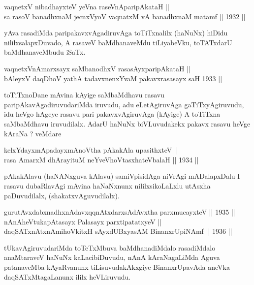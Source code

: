 \begin{shl}
vaqnetxV nibadhayxteV yeVna raseVnA\s \s paripAkataH ||  \\
sa rasoV banadhxnaM jecnxVyoV vaqnatxM vA banadhxnaM matamf ||  1932 || 
\end{shl}

\begin{artha}
yAva rasadiMda paripakavxvAgadiruvAga toTiTxnalilx (haNuNx) hiDidu
nililxsalapxDuvado, A rasaveV baMdhanaveMdu tiLiyabeVku, toTATxdarU
baMdhanaveMbudu iSaTx.
\end{artha}

\begin{shl}
vaqnetxVnA\s \s marxsayx saMbanodhxV rasasAyx\s \s paripAkataH || \\
bAleyxV daqDhoV yathA tadavxnenxYvaM pakavxrasasayx saH 1933 ||  
\end{shl}

\begin{artha}
toTiTxnoDane mAvina kAyige saMbaMdhavu rasavu
paripAkavAgadiruvudariMda iruvudu, adu eLetAgiruvAga gaTiTxyAgiruvudu,
idu heVgo hAgeye rasavu pari pakavxvAgiruvAga (kAyige) A toTiTxna
saMbaMdhavu iruvudilalx. AdarU haNuNx biVLuvudakekx pakavx rasavu heVge kAraNa ? veMdare 
\end{artha}

\begin{shl}
kelxYdayxmApadayxmAnoV\s tha pAkakAla upasithxteV || \\
rasa AmarxM dhArayituM neYveVhoVtasxhateV\s balaH ||  1934 ||  
\end{shl}

\begin{artha}
pAkakAlavu (haNANxguva kAlavu) samiVpisidAga niVrAgi mADalapxDalu I
rasavu dubaRlavAgi mAvina haNaNxnunx nililxsikoLaLxlu utAsxha
paDuvudilalx, (shakatxvAguvudilalx).
\end{artha}

\begin{shl}
gurutAvxdabxnadhxnAdavxqqnAtxdarxsAdAvx\s tha parxmucayxteV ||  1935 ||   \\
nAnAheVtukapAtasayx Palasayx parxtipatatxyeV ||  \\
daqSATxnAtxnAmihoVkitxH sAyxdUBxyasAM BinanxrUpiNAmf ||  1936 ||  
\end{shl}

\begin{artha}
tUkavAgiruvudariMda toTeTxMbuva baMdhanadiMdalo rasadiMdalo
anaMtaraveV haNuNx kaLacibiDuvudu, nAnA kAraNagaLiMda Aguva
patanaveMba kAyaRvanunx tiLisuvudakAkxgiye BinanxrUpavAda aneVka
daqSATxMtagaLanunx ililx heVLiruvudu.
\end{artha}

